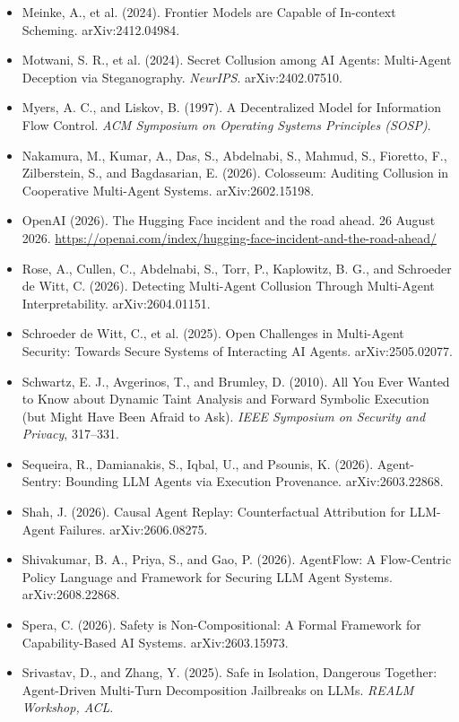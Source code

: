 \documentclass[11pt, a4paper]{article}
\begin{document}
\begin{itemize}
  \item Meinke, A., et al. (2024). Frontier Models are Capable of In-context Scheming. arXiv:2412.04984.
  \item Motwani, S. R., et al. (2024). Secret Collusion among AI Agents: Multi-Agent Deception via Steganography. \emph{NeurIPS}. arXiv:2402.07510.
  \item Myers, A. C., and Liskov, B. (1997). A Decentralized Model for Information Flow Control. \emph{ACM Symposium on Operating Systems Principles (SOSP)}.
  \item Nakamura, M., Kumar, A., Das, S., Abdelnabi, S., Mahmud, S., Fioretto, F., Zilberstein, S., and Bagdasarian, E. (2026). Colosseum: Auditing Collusion in Cooperative Multi-Agent Systems. arXiv:2602.15198.
  \item OpenAI (2026). The Hugging Face incident and the road ahead. 26 August 2026. \url{https://openai.com/index/hugging-face-incident-and-the-road-ahead/}
  \item Rose, A., Cullen, C., Abdelnabi, S., Torr, P., Kaplowitz, B. G., and Schroeder de Witt, C. (2026). Detecting Multi-Agent Collusion Through Multi-Agent Interpretability. arXiv:2604.01151.
  \item Schroeder de Witt, C., et al. (2025). Open Challenges in Multi-Agent Security: Towards Secure Systems of Interacting AI Agents. arXiv:2505.02077.
  \item Schwartz, E. J., Avgerinos, T., and Brumley, D. (2010). All You Ever Wanted to Know about Dynamic Taint Analysis and Forward Symbolic Execution (but Might Have Been Afraid to Ask). \emph{IEEE Symposium on Security and Privacy}, 317--331.
  \item Sequeira, R., Damianakis, S., Iqbal, U., and Psounis, K. (2026). Agent-Sentry: Bounding LLM Agents via Execution Provenance. arXiv:2603.22868.
  \item Shah, J. (2026). Causal Agent Replay: Counterfactual Attribution for LLM-Agent Failures. arXiv:2606.08275.
  \item Shivakumar, B. A., Priya, S., and Gao, P. (2026). AgentFlow: A Flow-Centric Policy Language and Framework for Securing LLM Agent Systems. arXiv:2608.22868.
  \item Spera, C. (2026). Safety is Non-Compositional: A Formal Framework for Capability-Based AI Systems. arXiv:2603.15973.
  \item Srivastav, D., and Zhang, Y. (2025). Safe in Isolation, Dangerous Together: Agent-Driven Multi-Turn Decomposition Jailbreaks on LLMs. \emph{REALM Workshop, ACL}.

\end{itemize}
\end{document}

